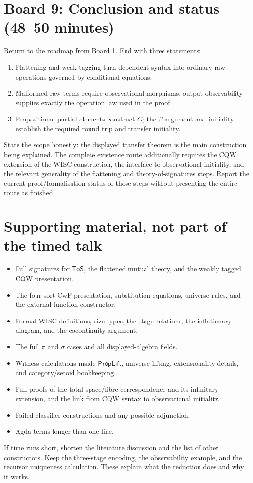 \documentclass[11pt]{article}
\newcommand{\PropLift}{\mathsf{PropLift}}
\newcommand{\ToS}{\mathsf{ToS}}
\begin{document}
\section*{Board 9: Conclusion and status (48--50 minutes)}

Return to the roadmap from Board 1. End with three statements:
\begin{enumerate}
 \item Flattening and weak tagging turn dependent syntax into ordinary raw
       operations governed by conditional equations.
 \item Malformed raw terms require observational morphisms; output
       observability supplies exactly the operation law used in the proof.
 \item Propositional partial elements construct \(G\); the \(\beta\) argument
       and initiality establish the required round trip and transfer
       initiality.
\end{enumerate}
State the scope honestly: the displayed transfer theorem is the main
construction being explained. The complete existence route additionally
requires the CQW extension of the WISC construction, the interface to
observational initiality, and the relevant generality of the flattening
and theory-of-signatures steps. Report the current proof/formalisation
status of those steps without presenting the entire route as finished.

\section*{Supporting material, not part of the timed talk}

\begin{itemize}
 \item Full signatures for \(\ToS\), the flattened mutual theory, and the
       weakly tagged CQW presentation.
 \item The four-sort CwF presentation, substitution equations, universe
       rules, and the external function constructor.
 \item Formal WISC definitions, size types, the stage relations, the
       inflationary diagram, and the cocontinuity argument.
 \item The full \(\pi\) and \(\sigma\) cases and all displayed-algebra fields.
 \item Witness calculations inside \(\PropLift\), universe lifting,
       extensionality details, and category/setoid bookkeeping.
 \item Full proofs of the total-space/fibre correspondence and its
       infinitary extension, and the link from CQW syntax to observational
       initiality.
 \item Failed classifier constructions and any possible adjunction.
 \item Agda terms longer than one line.
\end{itemize}
If time runs short, shorten the literature discussion and the list of other
constructors. Keep the three-stage encoding, the observability example,
and the recursor uniqueness calculation. These explain what the reduction
does and why it works.
\end{document}
